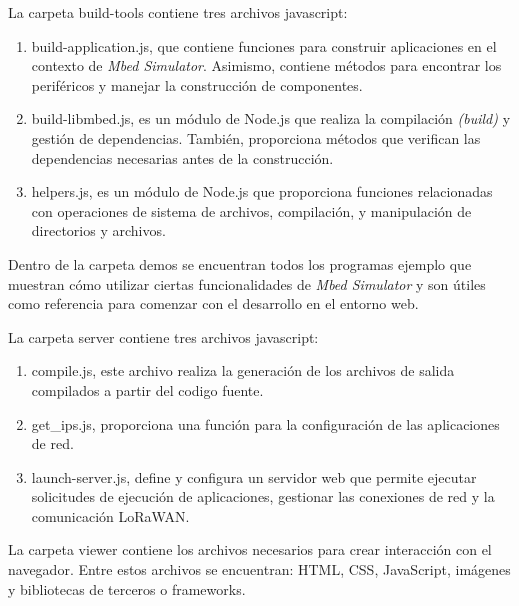La carpeta \textquotedbl build-tools\textquotedbl{}  contiene tres archivos javascript: 

\begin{enumerate}
	\item build-application.js, que contiene funciones para construir aplicaciones en el contexto de \textit{Mbed Simulator}. Asimismo, contiene métodos para encontrar los periféricos y manejar la construcción de componentes.
	
	\item build-libmbed.js, es un módulo de Node.js que realiza la compilación \textit{(build)} y gestión de dependencias. También, proporciona métodos que verifican las dependencias necesarias antes de la construcción.

	\item helpers.js,  es un módulo de Node.js que proporciona funciones relacionadas con operaciones de sistema de archivos, compilación, y manipulación de directorios y archivos.
\end{enumerate}
 
Dentro de la carpeta \textquotedbl demos\textquotedbl{}  se encuentran todos los programas ejemplo que muestran cómo utilizar ciertas funcionalidades de \textit{Mbed Simulator} y son útiles como referencia para comenzar con el desarrollo en el entorno web. 
 
La carpeta \textquotedbl server\textquotedbl{}  contiene tres archivos javascript: 

\begin{enumerate}
	\item compile.js, este archivo realiza la generación de los archivos de salida compilados a partir del codigo fuente.
	
	\item get\_ips.js, proporciona una función para la configuración de las aplicaciones de red.

	\item launch-server.js, define y configura un servidor web que permite ejecutar solicitudes de ejecución de aplicaciones, gestionar las conexiones de red y la comunicación LoRaWAN.
	
\end{enumerate}
 
La carpeta \textquotedbl viewer\textquotedbl{}  contiene los archivos necesarios para crear interacción con el navegador. Entre estos archivos se encuentran: HTML, CSS, JavaScript, imágenes y bibliotecas de terceros o frameworks.
 
